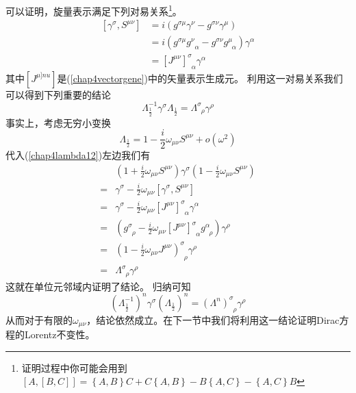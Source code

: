 可以证明，旋量表示满足下列对易关系\footnote{证明过程中你可能会用到$\left[A,\left[B,C\right]\right]=\left\{A,B\right\}C+C\left\{A,B\right\}-B\left\{A,C\right\}-\left\{A,C\right\}B$}。
\begin{equation}
\begin{aligned}
   \left[\gamma^{\sigma},S^{\mu\nu}\right] &=i(g^{\sigma\mu}\gamma^{\nu}-g^{\sigma\nu}\gamma^{\mu})\\
   &=i(g^{\sigma\mu}g^{\nu}_{\;\;\alpha}-g^{\sigma\nu}g^{\mu}_{\;\;\alpha})\gamma^{\alpha}\\
   &=\left[J^{\mu\nu}\right]^{\sigma}_{\;\;\alpha}\gamma^{\alpha}
   \end{aligned}
\end{equation}
其中$\left[J^{\mu]nu}\right]$是(\ref{chap4vectorgene})中的矢量表示生成元。
利用这一对易关系我们可以得到下列重要的结论
\begin{equation}
\label{chap4spinorimpor}
    \Lambda_{\frac{1}{2}}^{-1}\gamma^{\sigma}\Lambda_{\frac{1}{2}}=\Lambda^{\sigma}_{\;\;\rho}\gamma^{\rho}
\end{equation}
事实上，考虑无穷小变换
\begin{equation}
\label{chap4lambda12}
    \Lambda_{\frac{1}{2}}=1-\frac{i}{2}\omega_{\mu\nu}S^{\mu\nu}+o(\omega^{2})
\end{equation}
代入(\ref{chap4lambda12})左边我们有
\begin{equation}
    \begin{aligned}
    &(1+\frac{i}{2}\omega_{\mu\nu}S^{\mu\nu})\gamma^{\sigma}(1-\frac{i}{2}\omega_{\mu\nu}S^{\mu\nu})\\
    =&\gamma^{\sigma}-\frac{i}{2}\omega_{\mu\nu}\left[\gamma^{\sigma},S^{\mu\nu}\right]\\
    =&\gamma^{\sigma}-\frac{i}{2}\omega_{\mu\nu}\left[J^{\mu\nu}\right]^{\sigma}_{\;\;\alpha}\gamma^{\alpha}\\
    =&(g^{\sigma}_{\;\;\rho}-\frac{i}{2}\omega_{\mu\nu}\left[J^{\mu\nu}\right]^{\sigma}_{\;\;\alpha}g^{\alpha}_{\;\;\rho})\gamma^{\rho}\\
    =&\left(1-\frac{i}{2}\omega_{\mu\nu}J^{\mu\nu}\right)^{\sigma}_{\;\;\rho}\gamma^{\rho}\\
    =&\Lambda^{\sigma}_{\;\;\rho}\gamma^{\rho}
    \end{aligned}
\end{equation}
这就在单位元邻域内证明了结论。
归纳可知
\begin{equation}
    \left(\Lambda_{\frac{1}{2}}^{-1}\right)^{n}\gamma^{\sigma}\left(\Lambda_{\frac{1}{2}}\right)^{n}=\left(\Lambda^{n}\right)^{\sigma}_{\;\;\rho}\gamma^{\rho}
\end{equation}
从而对于有限的$\omega_{\mu\nu}$，结论依然成立。在下一节中我们将利用这一结论证明Dirac方程的Lorentz不变性。
